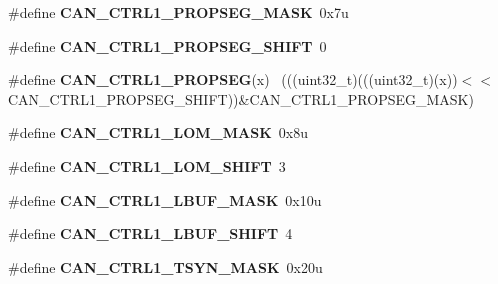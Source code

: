 \begin{DoxyCompactItemize}
\item 
\hypertarget{group___c_a_n___register___masks_ga0541429f7e3d35ec374c462a83c3ef49}{}\#define {\bfseries C\+A\+N\+\_\+\+C\+T\+R\+L1\+\_\+\+P\+R\+O\+P\+S\+E\+G\+\_\+\+M\+A\+S\+K}~0x7u\label{group___c_a_n___register___masks_ga0541429f7e3d35ec374c462a83c3ef49}

\item 
\hypertarget{group___c_a_n___register___masks_ga7eada40e9f9aafd9d58c38b3a3b295b5}{}\#define {\bfseries C\+A\+N\+\_\+\+C\+T\+R\+L1\+\_\+\+P\+R\+O\+P\+S\+E\+G\+\_\+\+S\+H\+I\+F\+T}~0\label{group___c_a_n___register___masks_ga7eada40e9f9aafd9d58c38b3a3b295b5}

\item 
\hypertarget{group___c_a_n___register___masks_ga44e0e76a89da9ed9a1e5d71deb8f3d54}{}\#define {\bfseries C\+A\+N\+\_\+\+C\+T\+R\+L1\+\_\+\+P\+R\+O\+P\+S\+E\+G}(x)                                      ~(((uint32\+\_\+t)(((uint32\+\_\+t)(x))$<$$<$C\+A\+N\+\_\+\+C\+T\+R\+L1\+\_\+\+P\+R\+O\+P\+S\+E\+G\+\_\+\+S\+H\+I\+F\+T))\&C\+A\+N\+\_\+\+C\+T\+R\+L1\+\_\+\+P\+R\+O\+P\+S\+E\+G\+\_\+\+M\+A\+S\+K)\label{group___c_a_n___register___masks_ga44e0e76a89da9ed9a1e5d71deb8f3d54}

\item 
\hypertarget{group___c_a_n___register___masks_gac216e0dd5c6df92a49c15077ca628187}{}\#define {\bfseries C\+A\+N\+\_\+\+C\+T\+R\+L1\+\_\+\+L\+O\+M\+\_\+\+M\+A\+S\+K}~0x8u\label{group___c_a_n___register___masks_gac216e0dd5c6df92a49c15077ca628187}

\item 
\hypertarget{group___c_a_n___register___masks_gafd8f79e66670cb6df0d70e93795649c6}{}\#define {\bfseries C\+A\+N\+\_\+\+C\+T\+R\+L1\+\_\+\+L\+O\+M\+\_\+\+S\+H\+I\+F\+T}~3\label{group___c_a_n___register___masks_gafd8f79e66670cb6df0d70e93795649c6}

\item 
\hypertarget{group___c_a_n___register___masks_ga91b1b6502a9996e9639d28760d00ee88}{}\#define {\bfseries C\+A\+N\+\_\+\+C\+T\+R\+L1\+\_\+\+L\+B\+U\+F\+\_\+\+M\+A\+S\+K}~0x10u\label{group___c_a_n___register___masks_ga91b1b6502a9996e9639d28760d00ee88}

\item 
\hypertarget{group___c_a_n___register___masks_ga1ebb72a42560e1f78bb6f10cfeec8945}{}\#define {\bfseries C\+A\+N\+\_\+\+C\+T\+R\+L1\+\_\+\+L\+B\+U\+F\+\_\+\+S\+H\+I\+F\+T}~4\label{group___c_a_n___register___masks_ga1ebb72a42560e1f78bb6f10cfeec8945}

\item 
\hypertarget{group___c_a_n___register___masks_ga2ceb4b7bca561020b4899dd2087e5260}{}\#define {\bfseries C\+A\+N\+\_\+\+C\+T\+R\+L1\+\_\+\+T\+S\+Y\+N\+\_\+\+M\+A\+S\+K}~0x20u\label{group___c_a_n___register___masks_ga2ceb4b7bca561020b4899dd2087e5260}


\end{DoxyCompactItemize}
